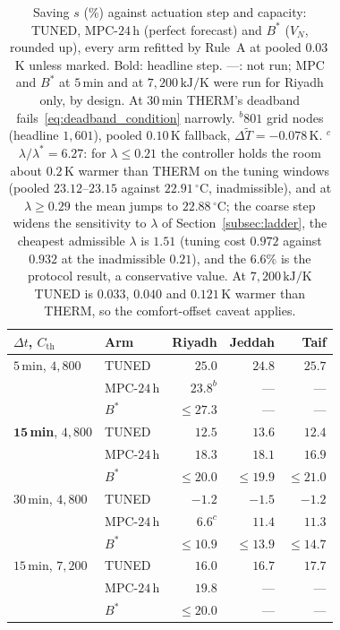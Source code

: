 \documentclass[pdflatex,sn-mathphys-num,iicol]{sn-jnl}
\theoremstyle{thmstyleone}\newtheorem{proposition}{Proposition}\newtheorem{corollary}{Corollary}
\theoremstyle{thmstyletwo}\newtheorem{remark}{Remark}\newtheorem{observation}{Observation}
\theoremstyle{thmstylethree}\newtheorem{definition}{Definition}
\newcommand{\Cth}{C_{\mathrm{th}}}
\begin{document}
\begin{table}[t]
\centering
\caption{Saving $s$ (\%) against actuation step and capacity: TUNED, MPC-$24\,$h
(perfect forecast) and $B^\ast$ ($V_N$, rounded up), every arm refitted by
Rule~A at pooled $0.03\,$K unless marked. Bold: headline step. ---: not run;
MPC and $B^\ast$ at $5\,$min and at $7{,}200\,\text{kJ/K}$ were run for
Riyadh only, by design. At $30\,$min THERM's deadband fails~\eqref{eq:deadband_condition}
narrowly.
$^{b}$$801$ grid nodes (headline $1{,}601$), pooled $0.10\,$K fallback,
$\Delta\tilde T=-0.078\,$K. $^{c}$$\lambda/\lambda^\ast=6.27$: for
$\lambda\le0.21$ the controller holds the room about $0.2\,$K warmer than THERM
on the tuning windows (pooled $23.12$--$23.15$ against $22.91\,^\circ$C,
inadmissible), and at $\lambda\ge0.29$ the mean jumps to $22.88\,^\circ$C; the
coarse step widens the sensitivity to $\lambda$ of Section~\ref{subsec:ladder}, the cheapest
admissible $\lambda$ is $1.51$ (tuning cost $0.972$ against $0.932$ at the
inadmissible $0.21$), and the $6.6\%$ is the protocol result, a conservative
value. At $7{,}200\,\text{kJ/K}$ TUNED is $0.033$, $0.040$ and $0.121\,$K
warmer than THERM, so the comfort-offset caveat applies.}
\label{tab:timestep}
\setlength{\tabcolsep}{2pt}
\footnotesize
\begin{tabular*}{\columnwidth}{@{\extracolsep{\fill}}llrrr@{}}
\toprule
$\Delta t$, $\Cth$ & Arm & Riyadh & Jeddah & Taif \\
\midrule
$5\,$min, $4{,}800$ & TUNED & $25.0$ & $24.8$ & $25.7$ \\
 & MPC-$24\,$h & $23.8^{b}$ & --- & --- \\
 & $B^\ast$ & $\le27.3$ & --- & --- \\
$\mathbf{15}\,$\textbf{min}, $4{,}800$ & TUNED & $12.5$ & $13.6$ & $12.4$ \\
 & MPC-$24\,$h & $18.3$ & $18.1$ & $16.9$ \\
 & $B^\ast$ & $\le20.0$ & $\le19.9$ & $\le21.0$ \\
$30\,$min, $4{,}800$ & TUNED & $-1.2$ & $-1.5$ & $-1.2$ \\
 & MPC-$24\,$h & $6.6^{c}$ & $11.4$ & $11.3$ \\
 & $B^\ast$ & $\le10.9$ & $\le13.9$ & $\le14.7$ \\
$15\,$min, $7{,}200$ & TUNED & $16.0$ & $16.7$ & $17.7$ \\
 & MPC-$24\,$h & $19.8$ & --- & --- \\
 & $B^\ast$ & $\le20.0$ & --- & --- \\
\bottomrule
\end{tabular*}
\end{table}
\end{document}
